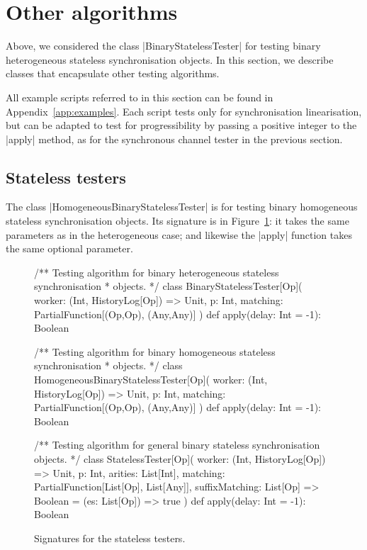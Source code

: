 \section{Other algorithms}

Above, we considered the class |BinaryStatelessTester| for testing binary
heterogeneous stateless synchronisation objects.  In this section, we describe
classes that encapsulate other testing algorithms.  

All example scripts referred to in this section can be found in
Appendix~\ref{app:examples}.  Each script tests only for synchronisation
linearisation, but can be adapted to test for progressibility by passing a
positive integer to the |apply| method, as for the synchronous channel tester
in the previous section.


\subsection{Stateless testers}

The class |HomogeneousBinaryStatelessTester| is for testing binary homogeneous
stateless synchronisation objects.  Its signature is in
Figure~\ref{fig:stateless-testers}: it takes the same parameters as in the
heterogeneous case; and likewise the |apply| function takes the same optional
parameter.


\begin{figure}
\begin{scala}
/** Testing algorithm for binary heterogeneous stateless synchronisation
  * objects. */
class BinaryStatelessTester[Op](
    worker: (Int, HistoryLog[Op]) => Unit,
    p: Int,
    matching: PartialFunction[(Op,Op), (Any,Any)]
){
  def apply(delay: Int = -1): Boolean
}

/** Testing algorithm for binary homogeneous stateless synchronisation
  * objects. */
class HomogeneousBinaryStatelessTester[Op](
    worker: (Int, HistoryLog[Op]) => Unit,
    p: Int,
    matching: PartialFunction[(Op,Op), (Any,Any)]
){
  def apply(delay: Int = -1): Boolean
}

/** Testing algorithm for general binary stateless synchronisation objects. */
class StatelessTester[Op](  
    worker: (Int, HistoryLog[Op]) => Unit,
    p: Int, 
    arities: List[Int],
    matching: PartialFunction[List[Op], List[Any]],
    suffixMatching: List[Op] => Boolean = (es: List[Op]) => true
){
  def apply(delay: Int = -1): Boolean
}
\end{scala}
\caption{Signatures for the stateless testers.\label{fig:stateless-testers}}
\end{figure}

